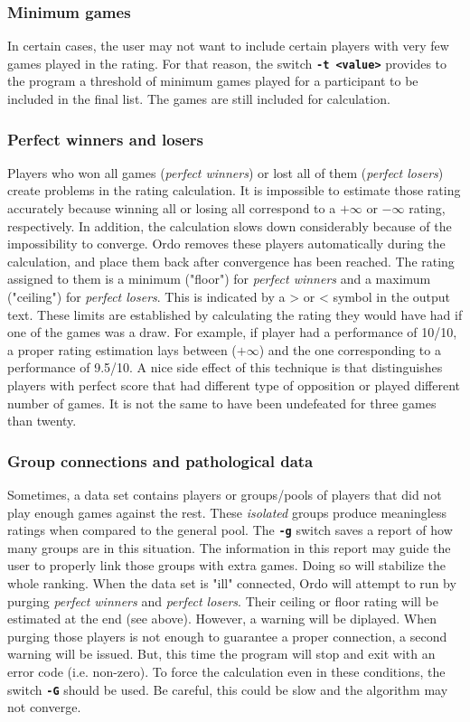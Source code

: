 \documentclass[12pt]{article}
\newcommand{\swtch} [1] {\texttt{\textbf{#1}}}
\begin{document}
\subsubsection*{Minimum games}

In certain cases, the user may not want to include certain players with very few games played in the rating. 
For that reason, the switch \swtch{-t <value>} provides to the program a threshold of minimum games played for a participant to be included in the final list.
The games are still included for calculation.

\subsubsection*{Perfect winners and losers}

Players who won all games (\textit{perfect winners}) or lost all of them (\textit{perfect losers}) create problems in the rating calculation.
It is impossible to estimate those rating accurately because winning all or losing all correspond to a $+\infty$ or $-\infty$ rating, respectively.
In addition, the calculation slows down considerably because of the impossibility to converge.
Ordo removes these players automatically during the calculation, and place them back after convergence has been reached.
The rating assigned to them is a minimum ("floor") for \textit{perfect winners} and a maximum ("ceiling") for \textit{perfect losers}.
This is indicated by a > or < symbol in the output text.
These limits are established by calculating the rating they would have had if one of the games was a draw.
For example, if player had a performance of 10/10, a proper rating estimation lays between ($+\infty$) and the one corresponding to a performance of 9.5/10.
A nice side effect of this technique is that distinguishes players with perfect score that had different type of opposition or played different number of games.
It is not the same to have been undefeated for three games than twenty.

\subsubsection*{Group connections and pathological data}

Sometimes, a data set contains players or groups/pools of players that did not play enough games against the rest. 
These \textit{isolated} groups produce meaningless ratings when compared to the general pool. 
The \swtch{-g} switch saves a report of how many groups are in this situation.
The information in this report may guide the user to properly link those groups with extra games.
Doing so will stabilize the whole ranking.
When the data set is "ill" connected, Ordo will attempt to run by purging \textit{perfect winners} and \textit{perfect losers}.
Their ceiling or floor rating will be estimated at the end (see above). 
However, a warning will be diplayed.
When purging those players is not enough to guarantee a proper connection, a second warning will be issued.
But, this time the program will stop and exit with an error code (i.e. non-zero).
To force the calculation even in these conditions, the switch \swtch{-G} should be used.
Be careful, this could be slow and the algorithm may not converge.
 
\end{document}
